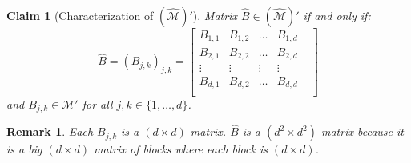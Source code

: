 \documentclass[12pt]{article}
\theoremstyle{plain}
\newtheorem{remark}[theorem]{Remark}
\newtheorem{claim}[theorem]{Claim}
\begin{document}
\begin{claim}[Characterization of $(\widehat{\mathcal{M}})'$]\label{claim-m-hat-prime}
    Matrix $\widehat{B} \in (\widehat{\mathcal{M}})'$ if and only if:
        \begin{equation}
        \widehat{B} = (B_{j,k})_{j,k} = 
    \begin{bmatrix}
    B_{1,1} & B_{1,2} & \dots &B_{1,d} \\
    B_{2,1} & B_{2,2} & \dots & B_{2,d}\\
    \vdots & \vdots & \vdots & \vdots \\
    B_{d, 1}& B_{d, 2}& \dots & B_{d,d} &\\
    \end{bmatrix}
    \end{equation}
and $B_{j,k} \in \mathcal{M}'$ for all $j,k \in \{1, \dots, d\}$.
\end{claim}
\begin{remark}
    Each $B_{j,k}$ is a $(d \times d)$ matrix. $\widehat{B}$ is a $(d^2 \times d^2)$ matrix because it is a big $(d \times d)$ matrix of blocks where each block is $(d \times d)$.
\end{remark}
\end{document}
